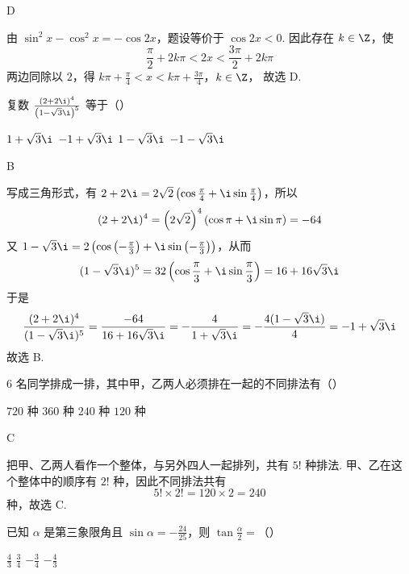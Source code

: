 \begin{answer}
D
\end{answer}

\begin{solution}
由 \(\sin^2x-\cos^2x=-\cos2x\)，题设等价于 \(\cos2x<0\). 因此存在 \(k\in\Z\)，使
\[
\frac{\pi}{2}+2k\pi<2x<\frac{3\pi}{2}+2k\pi
\]
两边同除以 \(2\)，得
\(k\pi+\frac{\pi}{4}<x<k\pi+\frac{3\pi}{4}\)，\(k\in\Z\)，
故选 D.
\end{solution}

\begin{problem}
复数 \(\frac{\left(2 + 2\i\right)^4}{\left(1 - \sqrt{3}\i\right)^5}\) 等于（\quad）

\choices
    {\(1 + \sqrt{3}\i\)}
    {\(-1 + \sqrt{3}\i\)}
    {\(1 - \sqrt{3}\i\)}
    {\(-1 - \sqrt{3}\i\)}
\end{problem}

\begin{answer}
B
\end{answer}

\begin{solution}
写成三角形式，有 \(2+2\i=2\sqrt{2}\left(\cos\frac{\pi}{4}+\i\sin\frac{\pi}{4}\right)\)，所以
\[
(2+2\i)^4=\left(2\sqrt{2}\right)^4\left(\cos\pi+\i\sin\pi\right)=-64
\]
又 \(1-\sqrt{3}\i=2\left(\cos\left(-\frac{\pi}{3}\right)+\i\sin\left(-\frac{\pi}{3}\right)\right)\)，从而
\[
(1-\sqrt{3}\i)^5=32\left(\cos\frac{\pi}{3}+\i\sin\frac{\pi}{3}\right)=16+16\sqrt{3}\i
\]
于是
\[
\frac{(2+2\i)^4}{(1-\sqrt{3}\i)^5}=\frac{-64}{16+16\sqrt{3}\i}=-\frac{4}{1+\sqrt{3}\i}=-\frac{4(1-\sqrt{3}\i)}{4}=-1+\sqrt{3}\i
\]
故选 B.
\end{solution}

\begin{problem}
\(6\text{ 名}\)同学排成一排，其中甲，乙两人必须排在一起的不同排法有（\quad）

\choices
    {\(720\text{ 种}\)}
    {\(360\text{ 种}\)}
    {\(240\text{ 种}\)}
    {\(120\text{ 种}\)}
\end{problem}

\begin{answer}
C
\end{answer}

\begin{solution}
把甲、乙两人看作一个整体，与另外四人一起排列，共有 \(5!\) 种排法. 甲、乙在这个整体中的顺序有 \(2!\) 种，因此不同排法共有
\[
5!\times2!=120\times2=240
\]
种，故选 C.
\end{solution}

\begin{problem}
已知 \(\alpha\) 是第三象限角且 \(\sin \alpha = -\frac{24}{25}\)，则 \(\tan \frac{\alpha}{2} =\)（\quad）

\choices
    {\(\frac{4}{3}\)}
    {\(\frac{3}{4}\)}
    {\(-\frac{3}{4}\)}
    {\(-\frac{4}{3}\)}
\end{problem}

